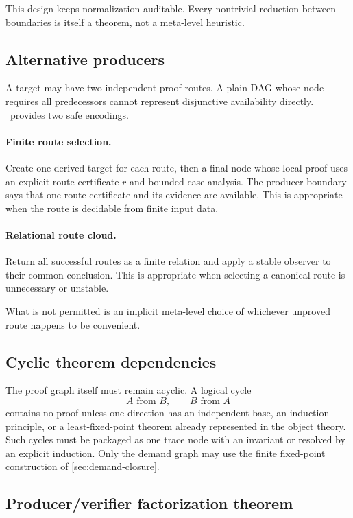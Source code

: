This design keeps normalization auditable.  Every nontrivial reduction between boundaries is itself a theorem, not a meta-level heuristic.

\subsection{Alternative producers}

A target may have two independent proof routes.  A plain DAG whose node requires all predecessors cannot represent disjunctive availability directly.  \CIFER\ provides two safe encodings.

\paragraph{Finite route selection.}
Create one derived target for each route, then a final node whose local proof uses an explicit route certificate \(r\) and bounded case analysis.  The producer boundary says that one route certificate and its evidence are available.  This is appropriate when the route is decidable from finite input data.

\paragraph{Relational route cloud.}
Return all successful routes as a finite relation and apply a stable observer to their common conclusion.  This is appropriate when selecting a canonical route is unnecessary or unstable.

What is not permitted is an implicit meta-level choice of whichever unproved route happens to be convenient.

\subsection{Cyclic theorem dependencies}

The proof graph itself must remain acyclic.  A logical cycle
\[
 A\text{ from }B,\qquad B\text{ from }A
\]
contains no proof unless one direction has an independent base, an induction principle, or a least-fixed-point theorem already represented in the object theory.  Such cycles must be packaged as one trace node with an invariant or resolved by an explicit induction.  Only the demand graph may use the finite fixed-point construction of \cref{sec:demand-closure}.

\subsection{Producer/verifier factorization theorem}

